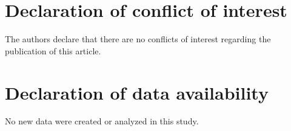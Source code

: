 \documentclass[sn-mathphys-num]{sn-jnl}%
\begin{document}
\section*{Declaration of conflict of interest}
The authors declare that there are no conflicts of interest regarding the publication of this article.

\section*{Declaration of data availability}
No new data were created or analyzed in this study.

% 


% 
\end{document}
